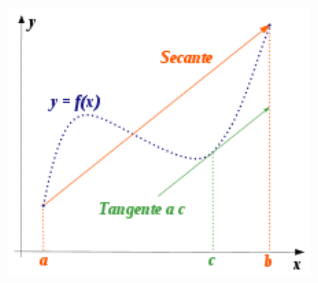 \documentclass[a4paper]{article}
\begin{document}
	\bigskip
	
	\begin{center}
		\includegraphics[width=8cm]{img/lagrange.png}
	\end{center}
	
	\newpage
\end{document}
